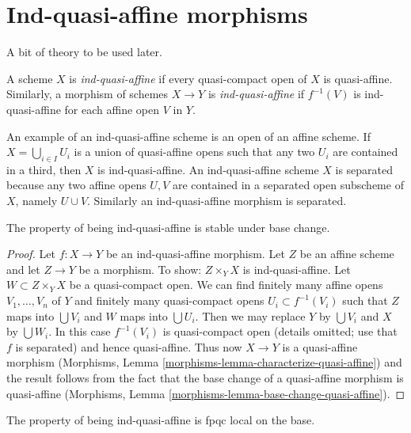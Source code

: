 \section{Ind-quasi-affine morphisms}
\label{section-ind-quasi-affine}

\noindent
A bit of theory to be used later.

\begin{definition}
\label{definition-ind-quasi-affine}
A scheme $X$ is {\it ind-quasi-affine} if every quasi-compact open of
$X$ is quasi-affine. Similarly, a morphism of schemes $X \to Y$
is {\it ind-quasi-affine} if $f^{-1}(V)$ is ind-quasi-affine
for each affine open $V$ in $Y$.
\end{definition}

\noindent
An example of an ind-quasi-affine scheme is an open of an affine scheme.
If $X = \bigcup_{i \in I} U_i$ is a union of quasi-affine opens such that
any two $U_i$ are contained in a third, then $X$ is ind-quasi-affine.
An ind-quasi-affine scheme $X$ is separated because any two affine
opens $U, V$ are contained in a separated open subscheme of $X$, namely
$U \cup V$. Similarly an ind-quasi-affine morphism is separated.

\begin{lemma}
\label{lemma-base-change-ind-quasi-affine}
The property of being ind-quasi-affine is stable under base change.
\end{lemma}

\begin{proof}
Let $f : X \to Y$ be an ind-quasi-affine morphism. Let $Z$ be an affine
scheme and let $Z \to Y$ be a morphism. To show: $Z \times_Y X$ is
ind-quasi-affine. Let $W \subset Z \times_Y X$ be a quasi-compact open.
We can find finitely many affine opens $V_1, \ldots, V_n$ of $Y$
and finitely many quasi-compact opens $U_i \subset f^{-1}(V_i)$
such that $Z$ maps into $\bigcup V_i$ and $W$ maps into $\bigcup U_i$.
Then we may replace $Y$ by $\bigcup V_i$ and $X$ by $\bigcup W_i$.
In this case $f^{-1}(V_i)$ is quasi-compact open (details omitted; use
that $f$ is separated) and hence quasi-affine. Thus now $X \to Y$
is a quasi-affine morphism (Morphisms, Lemma
\ref{morphisms-lemma-characterize-quasi-affine}) and the result
follows from the fact that the base change of a quasi-affine morphism
is quasi-affine (Morphisms, Lemma
\ref{morphisms-lemma-base-change-quasi-affine}).
\end{proof}

\begin{lemma}
\label{lemma-descending-property-ind-quasi-affine}
The property of being ind-quasi-affine is fpqc local on the base.
\end{lemma}

